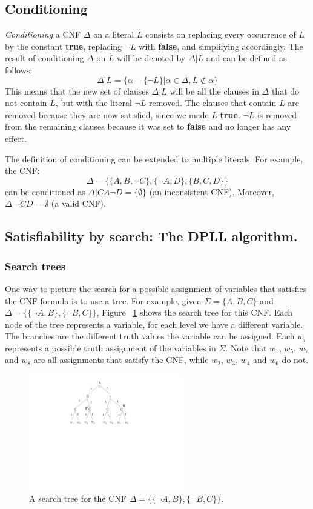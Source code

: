 \documentclass[12pt]{diicc}
\begin{document}
\subsection{Conditioning}
\textit{Conditioning} a CNF $\Delta$ on a literal $L$ consists on replacing every occurrence of $L$ by the constant \textbf{true}, replacing $\neg L$ with \textbf{false}, and simplifying accordingly. The result of conditioning $\Delta$ on $L$ will be denoted by $\Delta |L$ and can be defined as follows:
\[ \Delta |L=\{\alpha -\{\neg L\}|\alpha \in \Delta, L\notin \alpha\}\]
This means that the new set of clauses $\Delta |L$ will be all the clauses in $\Delta$ that do not contain $L$, but with the literal $\neg L$ removed. The clauses that contain $L$ are removed because they are now satisfied, since we made $L$ \textbf{true}. $\neg L$ is removed from the remaining clauses because it was set to \textbf{false} and no longer has any effect.

The definition of conditioning can be extended to multiple literals. For example, the CNF:
\[\Delta=\{\{A,B,\neg C\},\{\neg A,D\},\{B,C,D\}\}\]
can be conditioned as $\Delta |CA\neg D=\{\emptyset \}$ (an inconsistent CNF). Moreover, $\Delta |\neg CD=\emptyset$ (a valid CNF).

\subsection{Satisfiability by search: The DPLL algorithm.}

\subsubsection{Search trees}
One way to picture the search for a possible assignment of variables that satisfies the CNF formula is to use a tree. For example, given $\Sigma =\{A,B,C\}$ and $\Delta =\{\{\neg A,B\},\{\neg B,C\}\}$, Figure ~\ref{fig:searchtree} shows the search tree for this CNF. Each node of the tree represents a variable, for each level we have a different variable. The branches are the different truth values the variable can be assigned. Each $w_{i}$ represents a possible truth assignment of the variables in $\Sigma$. Note that $w_{1}$, $w_{5}$, $w_{7}$ and $w_{8}$ are all assignments that satisfy the CNF, while $w_{2}$, $w_{3}$, $w_{4}$ and $w_{6}$ do not.

\begin{figure}[h!]
	\centering
		\includegraphics[width=0.6\textwidth]{search_tree}
	\caption{A search tree for the CNF $\Delta =\{\{\neg A,B\},\{\neg B,C\}\}$.}
	\label{fig:searchtree}
\end{figure}
\end{document}
